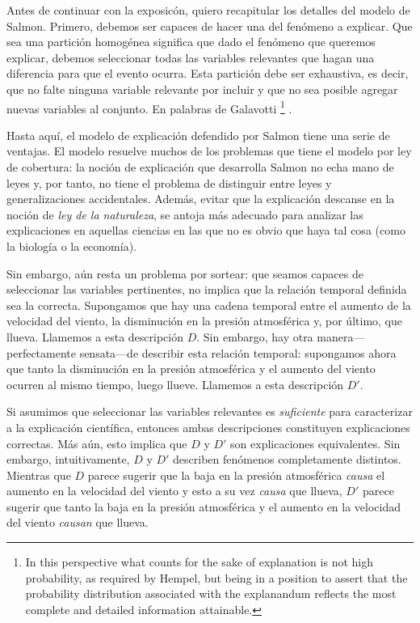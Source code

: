 Antes de continuar con la exposicón, quiero recapitular los detalles del modelo de Salmon. Primero, debemos ser capaces de hacer una  del fenómeno a explicar. Que sea una partición homogénea significa que dado el fenómeno que queremos explicar, debemos seleccionar todas las variables relevantes que hagan una diferencia para que el evento ocurra. Esta partición debe ser exhaustiva, es decir, que no falte ninguna variable relevante por incluir y que no sea posible agregar nuevas variables al conjunto. En palabras de Galavotti \footnote{
    In this perspective what counts	for the sake of    explanation is not high probability, as required by Hempel, but being in a position to assert that the probability distribution associated with the explanandum reflects the most complete and detailed information attainable.
}
\parencite{Galavotti2018}.

Hasta aquí, el modelo de explicación defendido por Salmon tiene una serie de ventajas. El modelo resuelve muchos de los problemas que tiene el modelo por ley de cobertura: la noción de explicación que desarrolla Salmon no echa mano de leyes y, por tanto, no tiene el problema de distinguir entre leyes y generalizaciones accidentales. Además, evitar que la explicación descanse en la noción de \emph{ley de la naturaleza}, se antoja más adecuado para analizar las explicaciones en aquellas ciencias en las que no es obvio que haya tal cosa (como la biología o la economía).

Sin embargo, aún resta un problema por sortear: que seamos capaces de seleccionar las variables pertinentes, no implica que la relación temporal definida sea la correcta. Supongamos que hay una cadena temporal entre el aumento de la velocidad del viento, la disminución en la presión atmosférica y, por último, que llueva. Llamemos a esta descripción $ D $. Sin embargo, hay otra manera---perfectamente sensata---de describir esta relación temporal: supongamos ahora que tanto la disminución en la presión atmosférica y el aumento del viento ocurren al mismo tiempo, luego llueve. Llamemos a esta descripción $ D' $.

Si asumimos que seleccionar las variables relevantes es \emph{suficiente} para caracterizar a la explicación científica, entonces ambas descripciones constituyen explicaciones correctas. Más aún, esto implica que $ D  $ y $  D' $ son explicaciones equivalentes. Sin embargo, intuitivamente, $ D $ y $ D' $ describen fenómenos completamente distintos. Mientras que $ D $ parece sugerir que la baja en la presión atmosférica \emph{causa} el aumento en la velocidad del viento y esto a su vez \emph{causa} que llueva, $ D' $ parece sugerir que tanto la baja en la presión atmosférica y el aumento en la velocidad del viento \emph{causan} que llueva.

